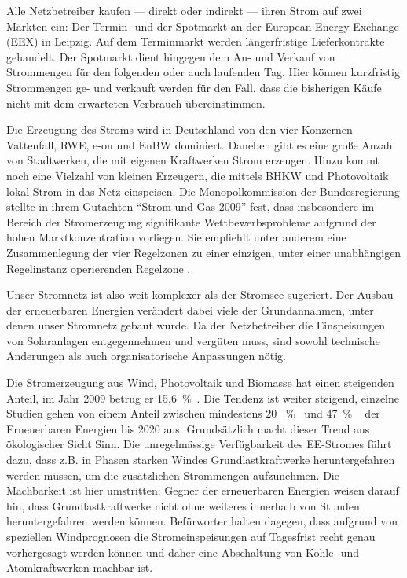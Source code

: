 \documentclass[12pt,BCOR=8.5mm]{scrartcl}
\begin{document}
\begin{enumerate}
    Alle Netzbetreiber kaufen --- direkt oder indirekt --- ihren Strom
    auf zwei Märkten ein: Der Termin- und der Spotmarkt an der European
    Energy Exchange (EEX) in Leipzig. Auf dem Terminmarkt werden
    längerfristige Lieferkontrakte gehandelt. Der Spotmarkt dient
    hingegen dem An- und Verkauf von Strommengen für den folgenden oder
    auch laufenden Tag. Hier können kurzfristig Strommengen ge- und
    verkauft werden für den Fall, dass die bisherigen Käufe nicht mit
    dem erwarteten Verbrauch übereinstimmen.

    Die Erzeugung des Stroms wird in Deutschland von den vier Konzernen
    Vattenfall, RWE, e-on und EnBW dominiert. Daneben gibt es eine
    große Anzahl von Stadtwerken, die mit eigenen Kraftwerken Strom
    erzeugen. Hinzu kommt noch eine Vielzahl von kleinen Erzeugern, die
    mittels BHKW und Photovoltaik lokal Strom in das Netz einspeisen.
    Die Monopolkommission der Bundesregierung stellte in ihrem Gutachten
    "`Strom und Gas 2009"' fest, dass insbesondere im Bereich der
    Stromerzeugung signifikante Wettbewerbsprobleme aufgrund der hohen
    Marktkonzentration vorliegen. Sie empfiehlt unter anderem eine
    Zusammenlegung der vier Regelzonen zu einer einzigen, unter einer
    unabhängigen Regelinstanz operierenden Regelzone
    \cite{monopolkommission09stromgas}. 
\end{enumerate}

Unser Stromnetz ist also weit komplexer als der Stromsee sugeriert.  Der
Ausbau der erneuerbaren Energien verändert dabei viele der
Grundannahmen, unter denen unser Stromnetz gebaut wurde. Da der
Netzbetreiber die Einspeisungen von Solaranlagen entgegennehmen und
vergüten muss, sind sowohl technische Änderungen als auch
organisatorische Anpassungen nötig.

Die Stromerzeugung aus Wind, Photovoltaik und Biomasse hat einen
steigenden Anteil, im Jahr 2009 betrug er
15,6~\%~\cite{web:bmwi-energiedaten}.  Die Tendenz ist weiter steigend,
einzelne Studien gehen von einem Anteil zwischen mindestens 20
~\%~\cite{dena05netzstudie1} und 47~\% ~\cite{iwes09simulation} der
Erneuerbaren Energien bis 2020 aus.  Grundsätzlich macht dieser Trend
aus ökologischer Sicht Sinn.  Die unregelmässige Verfügbarkeit des
EE-Stromes führt dazu, dass z.B. in Phasen starken Windes
Grundlastkraftwerke heruntergefahren werden müssen, um die zusätzlichen
Strommengen aufzunehmen. Die Machbarkeit ist hier umstritten:
Gegner der erneuerbaren Energien weisen darauf hin, dass
Grundlastkraftwerke nicht ohne weiteres innerhalb von Stunden
heruntergefahren werden können.  Befürworter halten dagegen, dass
aufgrund von speziellen Windprognosen die Stromeinspeisungen auf
Tagesfrist recht genau vorhergesagt werden können und daher eine
Abschaltung von Kohle- und Atomkraftwerken machbar ist.
\end{document}
